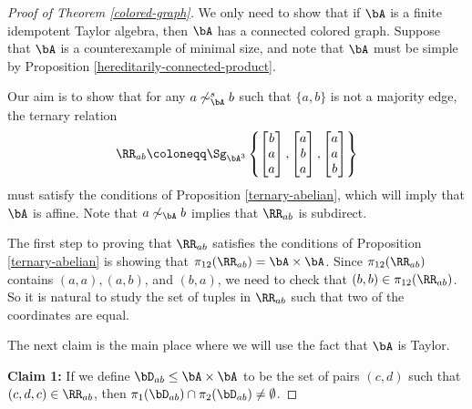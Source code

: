 \begin{proof}[Proof of Theorem \ref{colored-graph}] We only need to show that if $\bA$ is a finite idempotent Taylor algebra, then $\bA$ has a connected colored graph. Suppose that $\bA$ is a counterexample of minimal size, and note that $\bA$ must be simple by Proposition \ref{hereditarily-connected-product}.

Our aim is to show that for any $a \not\sim^s_\bA b$ such that $\{a,b\}$ is not a majority edge, the ternary relation
\[
\RR_{ab} \coloneqq \Sg_{\bA^3}\left\{\begin{bmatrix} b\\ a\\ a\end{bmatrix}, \begin{bmatrix} a\\ b\\ a\end{bmatrix}, \begin{bmatrix} a\\ a\\ b\end{bmatrix}\right\}
\]
must satisfy the conditions of Proposition \ref{ternary-abelian}, which will imply that $\bA$ is affine. Note that $a \not\sim_\bA b$ implies that $\RR_{ab}$ is subdirect.

The first step to proving that $\RR_{ab}$ satisfies the conditions of Proposition \ref{ternary-abelian} is showing that $\pi_{12}(\RR_{ab}) = \bA \times \bA$. Since $\pi_{12}(\RR_{ab})$ contains $(a,a), (a,b)$, and $(b,a)$, we need to check that $(b,b) \in \pi_{12}(\RR_{ab})$. So it is natural to study the set of tuples in $\RR_{ab}$ such that two of the coordinates are equal.

The next claim is the main place where we will use the fact that $\bA$ is Taylor.

{\bf Claim 1:} If we define $\bD_{ab} \le \bA\times\bA$ to be the set of pairs $(c,d)$ such that $(c,d,c) \in \RR_{ab}$, then $\pi_1(\bD_{ab}) \cap \pi_2(\bD_{ab}) \ne \emptyset$.


\end{proof}
